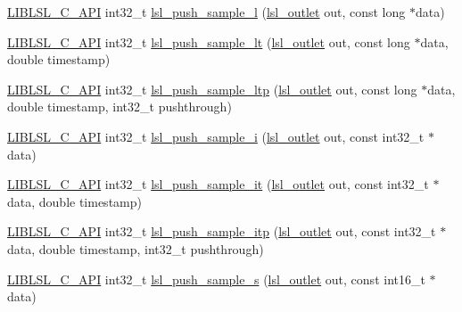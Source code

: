 \begin{DoxyCompactItemize}
\hyperlink{lsl__cpp_8h_aafd0ef1813e8be84a1420c4f1df64615}{L\+I\+B\+L\+S\+L\+\_\+\+C\+\_\+\+A\+PI} int32\+\_\+t \hyperlink{namespacelsl_a44dd3e59bb5d7e95b9ffa60032207457}{lsl\+\_\+push\+\_\+sample\+\_\+l} (\hyperlink{namespacelsl_abcf512b0f66dacf86c10b165995fd50b}{lsl\+\_\+outlet} out, const long $\ast$data)
\item 
\hyperlink{lsl__cpp_8h_aafd0ef1813e8be84a1420c4f1df64615}{L\+I\+B\+L\+S\+L\+\_\+\+C\+\_\+\+A\+PI} int32\+\_\+t \hyperlink{namespacelsl_ad257a8fe8aee5d302292dd40d93fe335}{lsl\+\_\+push\+\_\+sample\+\_\+lt} (\hyperlink{namespacelsl_abcf512b0f66dacf86c10b165995fd50b}{lsl\+\_\+outlet} out, const long $\ast$data, double timestamp)
\item 
\hyperlink{lsl__cpp_8h_aafd0ef1813e8be84a1420c4f1df64615}{L\+I\+B\+L\+S\+L\+\_\+\+C\+\_\+\+A\+PI} int32\+\_\+t \hyperlink{namespacelsl_a4839e55343dd8c3aea6c8e2a65d706ed}{lsl\+\_\+push\+\_\+sample\+\_\+ltp} (\hyperlink{namespacelsl_abcf512b0f66dacf86c10b165995fd50b}{lsl\+\_\+outlet} out, const long $\ast$data, double timestamp, int32\+\_\+t pushthrough)
\item 
\hyperlink{lsl__cpp_8h_aafd0ef1813e8be84a1420c4f1df64615}{L\+I\+B\+L\+S\+L\+\_\+\+C\+\_\+\+A\+PI} int32\+\_\+t \hyperlink{namespacelsl_a5e6e682a09b4c90732e4fc631d643384}{lsl\+\_\+push\+\_\+sample\+\_\+i} (\hyperlink{namespacelsl_abcf512b0f66dacf86c10b165995fd50b}{lsl\+\_\+outlet} out, const int32\+\_\+t $\ast$data)
\item 
\hyperlink{lsl__cpp_8h_aafd0ef1813e8be84a1420c4f1df64615}{L\+I\+B\+L\+S\+L\+\_\+\+C\+\_\+\+A\+PI} int32\+\_\+t \hyperlink{namespacelsl_a87f61ecb0058ef8cd14a84693770b51d}{lsl\+\_\+push\+\_\+sample\+\_\+it} (\hyperlink{namespacelsl_abcf512b0f66dacf86c10b165995fd50b}{lsl\+\_\+outlet} out, const int32\+\_\+t $\ast$data, double timestamp)
\item 
\hyperlink{lsl__cpp_8h_aafd0ef1813e8be84a1420c4f1df64615}{L\+I\+B\+L\+S\+L\+\_\+\+C\+\_\+\+A\+PI} int32\+\_\+t \hyperlink{namespacelsl_aa0f3b0ccc233ebed00178e189c4678af}{lsl\+\_\+push\+\_\+sample\+\_\+itp} (\hyperlink{namespacelsl_abcf512b0f66dacf86c10b165995fd50b}{lsl\+\_\+outlet} out, const int32\+\_\+t $\ast$data, double timestamp, int32\+\_\+t pushthrough)
\item 
\hyperlink{lsl__cpp_8h_aafd0ef1813e8be84a1420c4f1df64615}{L\+I\+B\+L\+S\+L\+\_\+\+C\+\_\+\+A\+PI} int32\+\_\+t \hyperlink{namespacelsl_a8d80592d7fd643d64533ef83f6808743}{lsl\+\_\+push\+\_\+sample\+\_\+s} (\hyperlink{namespacelsl_abcf512b0f66dacf86c10b165995fd50b}{lsl\+\_\+outlet} out, const int16\+\_\+t $\ast$data)

\end{DoxyCompactItemize}
